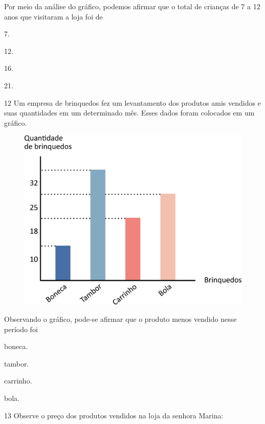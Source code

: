 Por meio da análise do gráfico, podemos afirmar que o total de crianças de 7 a 12 anos que visitaram a loja foi de

\begin{escolha}
\item
  7.
\item
  12.
\item
  16.
\item
  21.
\end{escolha}


\pagebreak
\num{12} Um empresa de brinquedos fez um levantamento dos produtos amis vendidos e suas quantidades em um determinado mês. Esses dados foram colocados em um gráfico.


\begin{figure}[htpb!]
\centering
\includegraphics[width=\textwidth]{./media/image119.png}
\end{figure}

Observando o gráfico, pode-se afirmar que o produto menos vendido nesse período foi

\begin{escolha}
\item
  boneca.
\item
  tambor.
\item
  carrinho.
\item
  bola.
\end{escolha}

\pagebreak
\num{13} Observe o preço dos produtos vendidos na loja da senhora Marina:

